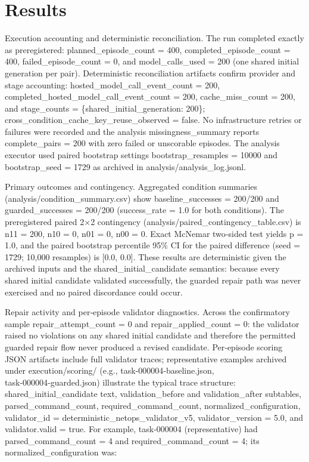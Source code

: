 \documentclass[conference]{IEEEtran}
\begin{document}
\section{Results}
Execution accounting and deterministic reconciliation. The run completed exactly as preregistered: planned\_episode\_count = 400, completed\_episode\_count = 400, failed\_episode\_count = 0, and model\_calls\_used = 200 (one shared initial generation per pair). Deterministic reconciliation artifacts confirm provider and stage accounting: hosted\_model\_call\_event\_count = 200, completed\_hosted\_model\_call\_event\_count = 200, cache\_miss\_count = 200, and stage\_counts = \{shared\_initial\_generation: 200\}; cross\_condition\_cache\_key\_reuse\_observed = false. No infrastructure retries or failures were recorded and the analysis missingness\_summary reports complete\_pairs = 200 with zero failed or unscorable episodes. The analysis executor used paired bootstrap settings bootstrap\_resamples = 10000 and bootstrap\_seed = 1729 as archived in analysis/analysis\_log.jsonl.

Primary outcomes and contingency. Aggregated condition summaries (analysis/condition\_summary.csv) show baseline\_successes = 200/200 and guarded\_successes = 200/200 (success\_rate = 1.0 for both conditions). The preregistered paired 2\ensuremath{\times}2 contingency (analysis/paired\_contingency\_table.csv) is n11 = 200, n10 = 0, n01 = 0, n00 = 0. Exact McNemar two‑sided test yields p = 1.0, and the paired bootstrap percentile 95\% CI for the paired difference (seed = 1729; 10,000 resamples) is [0.0, 0.0]. These results are deterministic given the archived inputs and the shared\_initial\_candidate semantics: because every shared initial candidate validated successfully, the guarded repair path was never exercised and no paired discordance could occur.

Repair activity and per‑episode validator diagnostics. Across the confirmatory sample repair\_attempt\_count = 0 and repair\_applied\_count = 0: the validator raised no violations on any shared initial candidate and therefore the permitted guarded repair flow never produced a revised candidate. Per‑episode scoring JSON artifacts include full validator traces; representative examples archived under execution/scoring/ (e.g., task‑000004‑baseline.json, task‑000004‑guarded.json) illustrate the typical trace structure: shared\_initial\_candidate text, validation\_before and validation\_after subtables, parsed\_command\_count, required\_command\_count, normalized\_configuration, validator\_id = deterministic\_netops\_validator\_v5, validator\_version = 5.0, and validator.valid = true. For example, task‑000004 (representative) had parsed\_command\_count = 4 and required\_command\_count = 4; its normalized\_configuration was:
\end{document}
